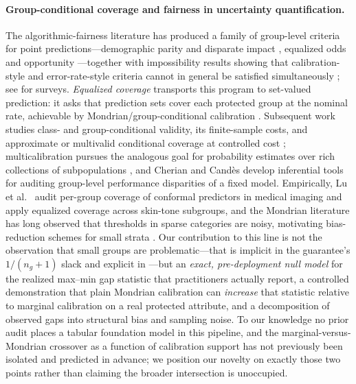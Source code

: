 \documentclass[review,12pt]{elsarticle}
\begin{document}
\paragraph{Group-conditional coverage and fairness in uncertainty quantification.}
The algorithmic-fairness literature has produced a family of group-level criteria for point predictions---demographic parity and disparate impact \cite{dwork2012,feldman2015}, equalized odds and opportunity \cite{hardt2016}---together with impossibility results showing that calibration-style and error-rate-style criteria cannot in general be satisfied simultaneously \cite{kleinberg2017,chouldechova2017,pleiss2017}; see \cite{mehrabi2021,barocas2023} for surveys. \emph{Equalized coverage} transports this program to set-valued prediction: it asks that prediction sets cover each protected group at the nominal rate, achievable by Mondrian/group-conditional calibration \cite{romano2020eq,vovk2003,vovk2012}. Subsequent work studies class- and group-conditional validity, its finite-sample costs, and approximate or multivalid conditional coverage at controlled cost \cite{ding2023,gibbs2023,jung2023}; multicalibration pursues the analogous goal for probability estimates over rich collections of subpopulations \cite{hebert2018}, and Cherian and Cand{\`e}s \cite{cherian2024} develop inferential tools for auditing group-level performance disparities of a fixed model. Empirically, Lu et al.\ \cite{lu2022fair} audit per-group coverage of conformal predictors in medical imaging and apply equalized coverage across skin-tone subgroups, and the Mondrian literature has long observed that thresholds in sparse categories are noisy, motivating bias-reduction schemes for small strata \cite{lofstrom2015}. Our contribution to this line is not the observation that small groups are problematic---that is implicit in the guarantee's $1/(n_g+1)$ slack and explicit in \cite{vovk2012,lofstrom2015}---but an \emph{exact, pre-deployment null model} for the realized max--min gap statistic that practitioners actually report, a controlled demonstration that plain Mondrian calibration can \emph{increase} that statistic relative to marginal calibration on a real protected attribute, and a decomposition of observed gaps into structural bias and sampling noise. To our knowledge no prior audit places a tabular foundation model in this pipeline, and the marginal-versus-Mondrian crossover as a function of calibration support has not previously been isolated and predicted in advance; we position our novelty on exactly those two points rather than claiming the broader intersection is unoccupied.
\end{document}
